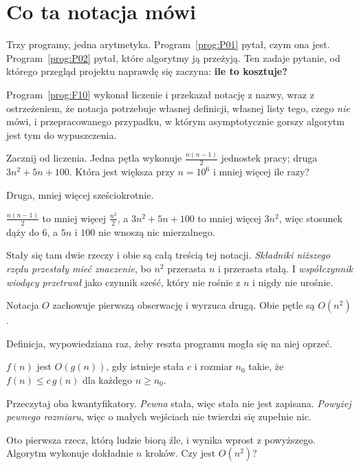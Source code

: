 \section{Co ta notacja mówi}
\label{sec:P03-says}

\begin{fr}
Trzy programy, jedna arytmetyka. Program~\ref{prog:P01} pytał, czym ona jest.
Program~\ref{prog:P02} pytał, które algorytmy ją przeżyją. Ten zadaje pytanie,
od którego przegląd projektu naprawdę się zaczyna: \textbf{ile to kosztuje?}

Program~\ref{prog:F10} wykonał liczenie i przekazał notację z nazwy, wraz z
ostrzeżeniem, że notacja potrzebuje własnej definicji, własnej listy tego,
czego \emph{nie} mówi, i przepracowanego przypadku, w którym asymptotycznie
gorszy algorytm jest tym do wypuszczenia.

Zacznij od liczenia. Jedna pętla wykonuje $\frac{n(n-1)}{2}$ jednostek pracy;
druga $3n^{2} + 5n + 100$. Która jest większa przy $n = 10^{6}$ i mniej więcej
ile razy?
\nextframe
\end{fr}

\begin{fr}
\begin{ansblock}
Druga, mniej więcej sześciokrotnie.
\end{ansblock}

$\frac{n(n-1)}{2}$ to mniej więcej $\frac{n^{2}}{2}$, a $3n^{2} + 5n + 100$ to
mniej więcej $3n^{2}$, więc stosunek dąży do $6$, a $5n$ i $100$ nie wnoszą
nic mierzalnego.

Stały się tam dwie rzeczy i obie są całą treścią tej notacji.
\emph{Składniki niższego rzędu przestały mieć znaczenie}, bo $n^{2}$ przerasta
$n$ i przerasta stałą. I \emph{współczynnik wiodący przetrwał} jako czynnik
sześć, który nie rośnie z $n$ i nigdy nie urośnie.

Notacja $O$ zachowuje pierwszą obserwację i wyrzuca drugą. Obie pętle są
$O(n^{2})$.
\end{fr}

\begin{fr}
Definicja, wypowiedziana raz, żeby reszta programu mogła się na niej oprzeć.

\medskip
\noindent
$f(n)$ jest $O(g(n))$, gdy istnieje stała $c$ i rozmiar $n_0$ takie, że
$f(n) \le c\,g(n)$ dla każdego $n \ge n_0$.

\medskip
\noindent
Przeczytaj oba kwantyfikatory. \emph{Pewna} stała, więc stała nie jest
zapisana. \emph{Powyżej pewnego rozmiaru}, więc o małych wejściach nie twierdzi
się zupełnie nic.

Oto pierwsza rzecz, którą ludzie biorą źle, i wynika wprost z powyższego.
Algorytm wykonuje dokładnie $n$ kroków. Czy jest $O(n^{2})$?
\nextframe
\end{fr}

